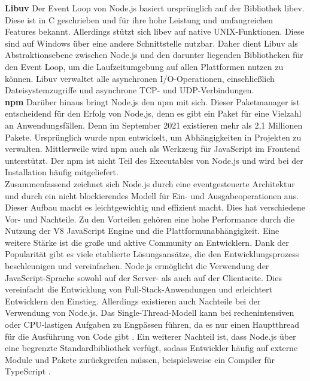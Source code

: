 \noindent
\textbf{Libuv} \newline
Der Event Loop von Node.js basiert ursprünglich auf der Bibliothek libev. Diese ist in C geschrieben und für ihre hohe Leistung und umfangreichen Features bekannt. Allerdings stützt sich libev auf native UNIX-Funktionen. Diese sind auf Windows über eine andere Schnittstelle nutzbar. Daher dient Libuv als Abstraktionsebene zwischen Node.js und den darunter liegenden Bibliotheken für den Event Loop, um die Laufzeitumgebung auf allen Plattformen nutzen zu können. Libuv verwaltet alle asynchronen I/O-Operationen, einschließlich Dateisystemzugriffe und asynchrone TCP- und UDP-Verbindungen.\cite{Springer.2022} \\

\noindent
\textbf{\ac{npm}} \newline
Darüber hinaus bringt Node.js den \ac{npm} mit sich. Dieser Paketmanager ist entscheidend für den Erfolg von Node.js, denn es gibt ein Paket für eine Vielzahl an Anwendungsfällen. Denn im September 2021 existieren mehr als 2,1 Millionen Pakete. Ursprünglich wurde \ac{npm} entwickelt, um Abhängigkeiten in Projekten zu verwalten. Mittlerweile wird \ac{npm} auch als Werkzeug für JavaScript im Frontend unterstützt.  Der \ac{npm} ist nicht Teil des Executables von Node.js und wird bei der Installation häufig mitgeliefert. \cite{Springer.2022, OpenJSFoundation.2022b}\\

\noindent
Zusammenfassend zeichnet sich Node.js durch eine eventgesteuerte Architektur und durch ein nicht blockierendes Modell für Ein- und Ausgabeoperationen aus. Dieser Aufbau macht es leichtgewichtig und effizient macht. Dies hat verschiedene Vor- und Nachteile. \newline
Zu den Vorteilen gehören eine hohe Performance durch die Nutzung der V8 JavaScript Engine und die Plattformunabhängigkeit. Eine weitere Stärke ist die große und aktive Community an Entwicklern. Dank der Popularität gibt es viele etablierte Lösungsansätze, die den Entwicklungsprozess beschleunigen und vereinfachen. Node.js ermöglicht die Verwendung der JavaScript-Sprache sowohl auf der Server- als auch auf der Clientseite. Dies vereinfacht die Entwicklung von Full-Stack-Anwendungen und erleichtert Entwicklern den Einstieg.\cite{Brown.November2019, OpenJSFoundation.2022b} \newline
Allerdings existieren auch Nachteile bei der Verwendung von Node.js. Das Single-Thread-Modell kann bei rechenintensiven oder CPU-lastigen Aufgaben zu Engpässen führen, da es nur einen Hauptthread für die Ausführung von Code gibt  \cite{Chhetri.2016}. Ein weiterer Nachteil ist, dass Node.js über eine begrenzte Standardbibliothek verfügt, sodass Entwickler häufig auf externe Module und Pakete zurückgreifen müssen, beispielsweise ein Compiler für TypeScript \cite{OpenJSFoundation.2022b}.

